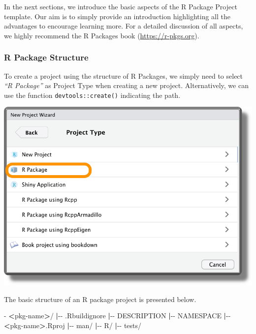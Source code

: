 \documentclass[
  11pt,
]{book}
\newenvironment{Shaded}{\begin{snugshade}}{\end{snugshade}}
\newcommand{\ExtensionTok}[1]{#1}
\newcommand{\KeywordTok}[1]{\textcolor[rgb]{0.13,0.29,0.53}{\textbf{#1}}}
\newcommand{\NormalTok}[1]{#1}
\newcommand{\OperatorTok}[1]{\textcolor[rgb]{0.81,0.36,0.00}{\textbf{#1}}}
\begin{document}
In the next sections, we introduce the basic aspects of the R Package Project template. Our aim is to simply provide an introduction highlighting all the advantages to encourage learning more. For a detailed discussion of all aspects, we highly recommend the R Packages book (\url{https://r-pkgs.org}).

\hypertarget{r-package-structure}{%
\subsubsection{R Package Structure}\label{r-package-structure}}

To create a project using the structure of R Packages, we simply need to select \emph{``R Package''} as Project Type when creating a new project. Alternatively, we can use the function \texttt{devtools::create()} indicating the path.

\begin{center}\includegraphics[width=0.7\linewidth]{images/coding/create-pkg} \end{center}

The basic structure of an R package project is presented below.

\begin{Shaded}
\begin{Highlighting}[]
\ExtensionTok{{-}} \OperatorTok{\textless{}}\NormalTok{pkg{-}name}\OperatorTok{\textgreater{}}\NormalTok{/}
    \KeywordTok{|}\ExtensionTok{{-}{-}}\NormalTok{ .Rbuildignore}
    \KeywordTok{|}\ExtensionTok{{-}{-}}\NormalTok{ DESCRIPTION}
    \KeywordTok{|}\ExtensionTok{{-}{-}}\NormalTok{ NAMESPACE}
    \KeywordTok{|}\ExtensionTok{{-}{-}} \OperatorTok{\textless{}}\NormalTok{pkg{-}name}\OperatorTok{\textgreater{}}\NormalTok{.Rproj}
    \KeywordTok{|}\ExtensionTok{{-}{-}}\NormalTok{ man/}
    \KeywordTok{|}\ExtensionTok{{-}{-}}\NormalTok{ R/}
    \KeywordTok{|}\ExtensionTok{{-}{-}}\NormalTok{ tests/}
\end{Highlighting}
\end{Shaded}
\end{document}
